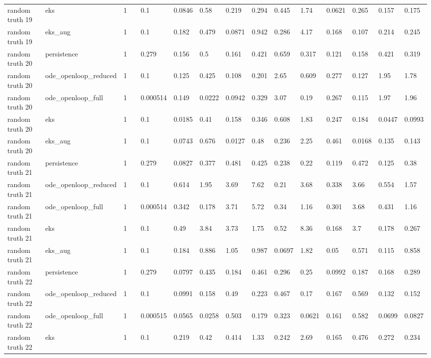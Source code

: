 \begin{table}[t]
\begin{tabular}{lllllllllllllll}
random truth 19 & eks & 1 &  & 0.1 & 0.0846 & 0.58 & 0.219 & 0.294 & 0.445 & 1.74 & 0.0621 & 0.265 & 0.157 & 0.175 \\
random truth 19 & eks\_aug & 1 &  & 0.1 & 0.182 & 0.479 & 0.0871 & 0.942 & 0.286 & 4.17 & 0.168 & 0.107 & 0.214 & 0.245 \\
random truth 20 & persistence & 1 &  & 0.279 & 0.156 & 0.5 & 0.161 & 0.421 & 0.659 & 0.317 & 0.121 & 0.158 & 0.421 & 0.319 \\
random truth 20 & ode\_openloop\_reduced & 1 &  & 0.1 & 0.125 & 0.425 & 0.108 & 0.201 & 2.65 & 0.609 & 0.277 & 0.127 & 1.95 & 1.78 \\
random truth 20 & ode\_openloop\_full & 1 &  & 0.000514 & 0.149 & 0.0222 & 0.0942 & 0.329 & 3.07 & 0.19 & 0.267 & 0.115 & 1.97 & 1.96 \\
random truth 20 & eks & 1 &  & 0.1 & 0.0185 & 0.41 & 0.158 & 0.346 & 0.608 & 1.83 & 0.247 & 0.184 & 0.0447 & 0.0993 \\
random truth 20 & eks\_aug & 1 &  & 0.1 & 0.0743 & 0.676 & 0.0127 & 0.48 & 0.236 & 2.25 & 0.461 & 0.0168 & 0.135 & 0.143 \\
random truth 21 & persistence & 1 &  & 0.279 & 0.0827 & 0.377 & 0.481 & 0.425 & 0.238 & 0.22 & 0.119 & 0.472 & 0.125 & 0.38 \\
random truth 21 & ode\_openloop\_reduced & 1 &  & 0.1 & 0.614 & 1.95 & 3.69 & 7.62 & 0.21 & 3.68 & 0.338 & 3.66 & 0.554 & 1.57 \\
random truth 21 & ode\_openloop\_full & 1 &  & 0.000514 & 0.342 & 0.178 & 3.71 & 5.72 & 0.34 & 1.16 & 0.301 & 3.68 & 0.431 & 1.16 \\
random truth 21 & eks & 1 &  & 0.1 & 0.49 & 3.84 & 3.73 & 1.75 & 0.52 & 8.36 & 0.168 & 3.7 & 0.178 & 0.267 \\
random truth 21 & eks\_aug & 1 &  & 0.1 & 0.184 & 0.886 & 1.05 & 0.987 & 0.0697 & 1.82 & 0.05 & 0.571 & 0.115 & 0.858 \\
random truth 22 & persistence & 1 &  & 0.279 & 0.0797 & 0.435 & 0.184 & 0.461 & 0.296 & 0.25 & 0.0992 & 0.187 & 0.168 & 0.289 \\
random truth 22 & ode\_openloop\_reduced & 1 &  & 0.1 & 0.0991 & 0.158 & 0.49 & 0.223 & 0.467 & 0.17 & 0.167 & 0.569 & 0.132 & 0.152 \\
random truth 22 & ode\_openloop\_full & 1 &  & 0.000515 & 0.0565 & 0.0258 & 0.503 & 0.179 & 0.323 & 0.0621 & 0.161 & 0.582 & 0.0699 & 0.0827 \\
random truth 22 & eks & 1 &  & 0.1 & 0.219 & 0.42 & 0.414 & 1.33 & 0.242 & 2.69 & 0.165 & 0.476 & 0.272 & 0.234 \\

\end{tabular}
\end{table}
